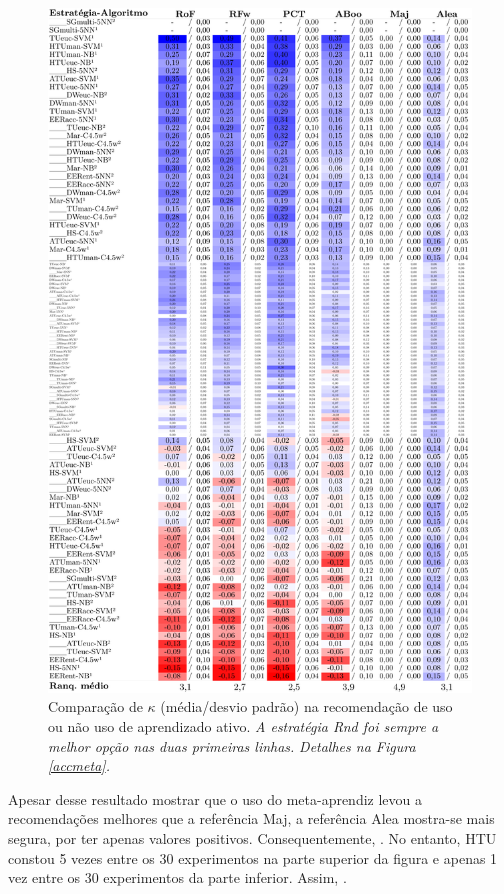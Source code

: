 \begin{figure}
\centering
\includegraphics[scale=0.215]{images/metaaa.pdf}
\caption[Comparação de $\kappa$ na recomendação de uso de aprendizado ativo.]{Comparação de $\kappa$ (média/desvio padrão) na recomendação de uso ou não uso de aprendizado ativo.
\textit{A estratégia Rnd foi sempre a melhor opção nas duas primeiras linhas.}
\textit{Detalhes na Figura \ref{accmeta}.}}
\label{aa}
\end{figure}
Apesar desse resultado mostrar que o uso do meta-aprendiz levou a recomendações melhores que %
a referência Maj, a referência Alea mostra-se mais segura, por ter apenas valores positivos.
Consequentemente, .
No entanto, HTU constou 5 vezes entre os 30 experimentos na parte superior da figura e apenas 1 vez entre os 30 experimentos da parte inferior.
Assim, .

